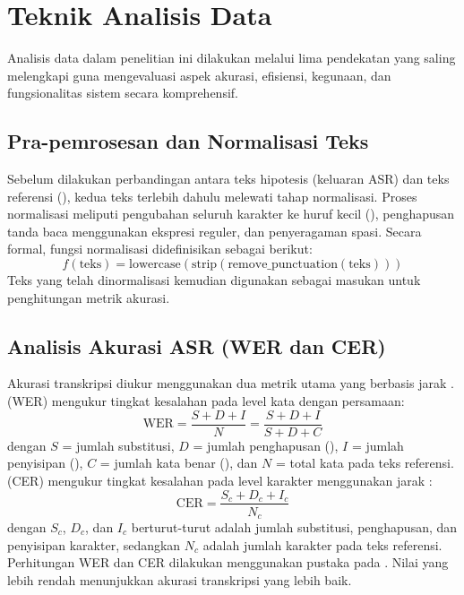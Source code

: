 \section{Teknik Analisis Data}
Analisis data dalam penelitian ini dilakukan melalui lima pendekatan yang saling melengkapi guna mengevaluasi aspek akurasi, efisiensi, kegunaan, dan fungsionalitas sistem secara komprehensif.

\subsection{Pra-pemrosesan dan Normalisasi Teks}
Sebelum dilakukan perbandingan antara teks hipotesis (keluaran ASR) dan teks referensi (), kedua teks terlebih dahulu melewati tahap normalisasi. Proses normalisasi meliputi pengubahan seluruh karakter ke huruf kecil (), penghapusan tanda baca menggunakan ekspresi reguler, dan penyeragaman spasi. Secara formal, fungsi normalisasi didefinisikan sebagai berikut:
\begin{equation}
    f(\text{teks}) = \text{lowercase}(\text{strip}(\text{remove\_punctuation}(\text{teks})))
\end{equation}
Teks yang telah dinormalisasi kemudian digunakan sebagai masukan untuk penghitungan metrik akurasi.

\subsection{Analisis Akurasi ASR (WER dan CER)}
Akurasi transkripsi diukur menggunakan dua metrik utama yang berbasis jarak .  (WER) mengukur tingkat kesalahan pada level kata dengan persamaan:
    \begin{equation}
        \text{WER} = \frac{S + D + I}{N} = \frac{S + D + I}{S + D + C}
    \end{equation}
    dengan $S$ = jumlah substitusi, $D$ = jumlah penghapusan (), $I$ = jumlah penyisipan (), $C$ = jumlah kata benar (), dan $N$ = total kata pada teks referensi.
 (CER) mengukur tingkat kesalahan pada level karakter menggunakan jarak :
    \begin{equation}
        \text{CER} = \frac{S_c + D_c + I_c}{N_c}
    \end{equation}
    dengan $S_c$, $D_c$, dan $I_c$ berturut-turut adalah jumlah substitusi, penghapusan, dan penyisipan karakter, sedangkan $N_c$ adalah jumlah karakter pada teks referensi.
Perhitungan WER dan CER dilakukan menggunakan pustaka  pada . Nilai yang lebih rendah menunjukkan akurasi transkripsi yang lebih baik.

